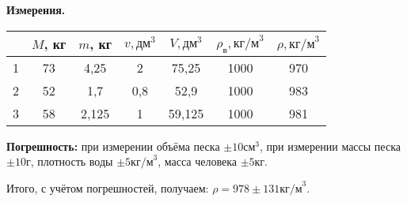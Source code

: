 \begin{center}
  \textbf{Измерения.}  
\end{center}
\begin{table}[h]
  \centering
  \label{tbl:bz09_1}
  \begin{tabular}{|c|c|c|c|c|c|c|}
    \hline
    {} & $M$, кг & $m$, кг & $v,\unit{дм}^3$ & $V,\unit{дм}^3$ &
    $\rho_{\text{в}},\unit{кг/м}^3$ & $\rho, \unit{кг/м}^3$ \\
    \hline
    1 & 73 & 4,25 & 2 & 75,25 & 1000 & 970\\
    \hline
    2 & 52 & 1,7 & 0,8 & 52,9 & 1000 & 983\\
    \hline
    3 & 58 & 2,125 & 1 & 59,125 & 1000 & 981\\
    \hline
  \end{tabular}
\end{table}

\textbf{Погрешность:} при измерении объёма песка $\pm 10\unit{см}^3$,
при измерении массы песка $\pm 10 \unit{г}$, плотность воды $\pm 5
\unit{кг/м}^3$, масса человека $\pm 5 \unit{кг}$. 

Итого, с учётом погрешностей, получаем: $\rho=978 \pm 131
\unit{кг/м}^3$. 

